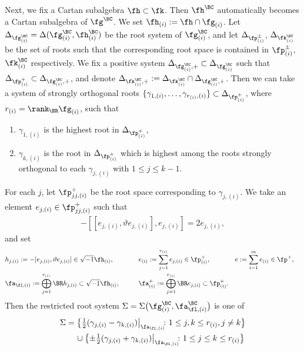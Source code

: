 Next, we fix a Cartan subalgebra $\fh\subset\fk$. Then $\fh^\BC$ automatically becomes a Cartan subalgebra of $\fg^\BC$.
We set $\fh_{(i)}:=\fh\cap\fg_{(i)}$.
Let $\Delta_{\fg^\BC_{(i)}}=\Delta(\fg^\BC_{(i)},\fh^{\BC}_{(i)})$ be the root system of $\fg^\BC_{(i)}$,
and let $\Delta_{\fp^\pm_{(i)}}$, $\Delta_{\fk^\BC_{(i)}}$ be the set of roots
such that the corresponding root space is contained in $\fp^\pm_{(i)}$, $\fk^\BC_{(i)}$ respectively.
We fix a positive system $\Delta_{\fg^\BC_{(i)},+}\subset \Delta_{\fg^\BC_{(i)}}$
such that $\Delta_{\fp^+_{(i)}}\subset\Delta_{\fg^\BC_{(i)},+}$,
and denote $\Delta_{\fk^\BC_{(i)},+}:=\Delta_{\fk^\BC_{(i)}}\cap \Delta_{\fg^\BC_{(i)},+}$.
Then we can take a system of strongly orthogonal roots
$\{\gamma_{1,(i)},\ldots,\gamma_{r_{(i)},(i)}\}\subset \Delta_{\fp^+_{(i)}}$,
where $r_{(i)}=\rank_\BR\fg_{(i)}$, such that
\begin{enumerate}\itemsep=0pt
\item $\gamma_{1,(i)}$ is the highest root in $\Delta_{\fp^+_{(i)}}$,
\item $\gamma_{k,(i)}$ is the root in $\Delta_{\fp^+_{(i)}}$
which is highest among the roots strongly orthogonal to each $\gamma_{j,(i)}$ with $1\le j\le k-1$.
\end{enumerate}
For each $j$, let $\fp^+_{jj,(i)}$ be the root space corresponding to $\gamma_{j,(i)}$.
We take an element $e_{j,(i)}\in\fp^+_{jj,(i)}$ such that
\begin{gather*} -[[e_{j,(i)},\vartheta e_{j,(i)}],e_{j,(i)}]=2e_{j,(i)}, \end{gather*}
and set
\begin{alignat*}{4}
& h_{j,(i)}:=-[e_{j,(i)},\vartheta e_{j,(i)}]\in\sqrt{-1}\fh_{(i)},\qquad && e_{(i)}:=\sum_{j=1}^{r_{(i)}}e_{j,(i)}\in\fp^+_{(i)},\qquad && e:=\sum_{i=1}^m e_{(i)}\in\fp^+,& \\
&\fa_{\fl,(i)}:=\bigoplus_{j=1}^{r_{(i)}}\BR h_{j,(i)}\subset\sqrt{-1}\fh_{(i)},\qquad && \fa_{(i)}^+:=\bigoplus_{j=1}^{r_{(i)}}\BR e_{j,(i)}\subset\fp^+_{(i)}.&&&
\end{alignat*}
Then the restricted root system $\Sigma=\Sigma\big(\fg^\BC_{(i)},\fa_{\fl,(i)}^\BC\big)$ is one of
\begin{gather*} \Sigma=\big\{ \tfrac{1}{2}(\gamma_{j,(i)}-\gamma_{k,(i)})\big|_{\fa_{\fl,(i)}}\!\!\colon
 1\le j, k\le r_{(i)}, j\ne k \big\}\\
 \hphantom{\Sigma=}{}
\cup\big\{{\pm}\tfrac{1}{2}(\gamma_{j,(i)}+\gamma_{k,(i)})\big|_{\fa_{\fl,(i)}}\!\!\colon 1\le j\le k\le r_{(i)}\big\} \end{gather*}
